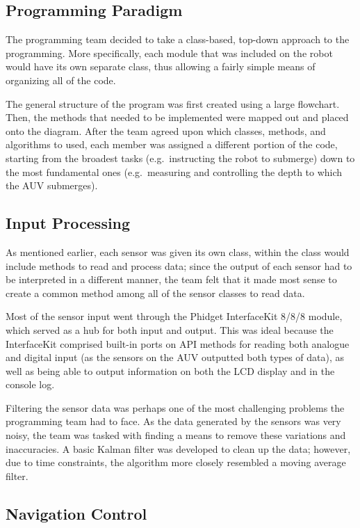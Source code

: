 \documentclass[12pt, letterpaper, twocolumn, titlepage]{article}
\begin{document}
\subsection{Programming Paradigm}

The programming team decided to take a class-based, top-down approach to the programming. More specifically, each module that was included on the robot would have \newpage\noindent its own separate class, thus allowing a fairly simple means of organizing all of the code.

The general structure of the program was first created using a large flowchart. Then, the methods that needed to be implemented were mapped out and placed onto the diagram. After the team agreed upon which classes, methods, and algorithms to used, each member was assigned a different portion of the code, starting from the broadest tasks (e.g.~instructing the robot to submerge) down to the most fundamental ones (e.g.~measuring and controlling the depth to which the AUV submerges).

\subsection{Input Processing}

As mentioned earlier, each sensor was given its own class, within the class would include methods to read and process data; since the output of each sensor had to be interpreted in a different manner, the team felt that it made most sense to create a common method among all of the sensor classes to read data.

Most of the sensor input went through the Phidget InterfaceKit 8/8/8 module, which served as a hub for both input and output. This was ideal because the InterfaceKit comprised built-in ports on API methods for reading both analogue and digital input (as the sensors on the AUV outputted both types of data), as well as being able to output information on both the LCD display and in the console log.

Filtering the sensor data was perhaps one of the most challenging problems the programming team had to face. As the data generated by the sensors was very noisy, the team was tasked with finding a means to remove these variations and inaccuracies. A basic Kalman filter was developed to clean up the data; however, due to time constraints, the algorithm more closely resembled a moving average filter.

\subsection{Navigation Control}
\end{document}
